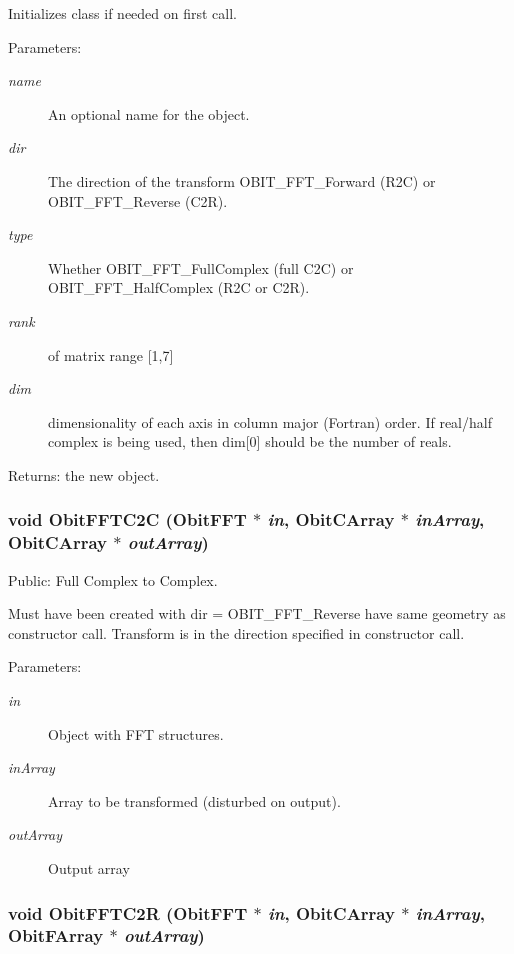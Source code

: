 Initializes class if needed on first call. \begin{Desc}
\item[Parameters:]
\begin{description}
\item[{\em name}]An optional name for the object. \item[{\em dir}]The direction of the transform OBIT\_\-FFT\_\-Forward (R2C) or OBIT\_\-FFT\_\-Reverse (C2R). \item[{\em type}]Whether OBIT\_\-FFT\_\-Full\-Complex (full C2C) or OBIT\_\-FFT\_\-Half\-Complex (R2C or C2R). \item[{\em rank}]of matrix range [1,7] \item[{\em dim}]dimensionality of each axis in column major (Fortran) order. If real/half complex is being used, then dim[0] should be the number of reals. \end{description}
\end{Desc}
\begin{Desc}
\item[Returns:]the new object. \end{Desc}
\subsubsection{\setlength{\rightskip}{0pt plus 5cm}void Obit\-FFTC2C ({\bf Obit\-FFT} $\ast$ {\em in}, {\bf Obit\-CArray} $\ast$ {\em in\-Array}, {\bf Obit\-CArray} $\ast$ {\em out\-Array})}\label{ObitFFT_8h_a17}


Public: Full Complex to Complex. 

Must have been created with dir = OBIT\_\-FFT\_\-Reverse have same geometry as constructor call. Transform is in the direction specified in constructor call. \begin{Desc}
\item[Parameters:]
\begin{description}
\item[{\em in}]Object with FFT structures. \item[{\em in\-Array}]Array to be transformed (disturbed on output). \item[{\em out\-Array}]Output array \end{description}
\end{Desc}
\subsubsection{\setlength{\rightskip}{0pt plus 5cm}void Obit\-FFTC2R ({\bf Obit\-FFT} $\ast$ {\em in}, {\bf Obit\-CArray} $\ast$ {\em in\-Array}, {\bf Obit\-FArray} $\ast$ {\em out\-Array})}\label{ObitFFT_8h_a16}


